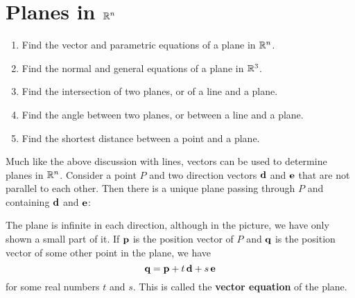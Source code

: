 \section{Planes in $\mathbb{R}^n$}

\begin{outcome}
  \begin{enumerate}
  \item Find the vector and parametric equations of a plane in $\mathbb{R}^n$.
  \item Find the normal and general equations of a plane in $\mathbb{R}^3$.
  \item Find the intersection of two planes, or of a line and a plane.
  \item Find the angle between two planes, or between a line and a plane.
  \item Find the shortest distance between a point and a plane.
  \end{enumerate}
\end{outcome}

Much like the above discussion with lines, vectors can be used to
determine planes in $\mathbb{R}^n$. Consider a point $P$ and two direction
vectors $\mbox{\bf d}$ and $\mbox{\bf e}$ that are not parallel to each
other. Then there is a unique plane passing through $P$ and containing
$\mbox{\bf d}$ and $\mbox{\bf e}$:
\begin{center}
\end{center}
The plane is infinite in each direction, although in the picture, we
have only shown a small part of it. If $\mbox{\bf p}$ is the position
vector of $P$ and $\mbox{\bf q}$ is the position vector of some other
point in the plane, we have
\begin{equation*}
  \mbox{\bf q} = \mbox{\bf p} + t\,\mbox{\bf d} + s\,\mbox{\bf e}
\end{equation*}
for some real numbers $t$ and $s$. This is called the \textbf{vector
  equation}%
 of the
plane.

